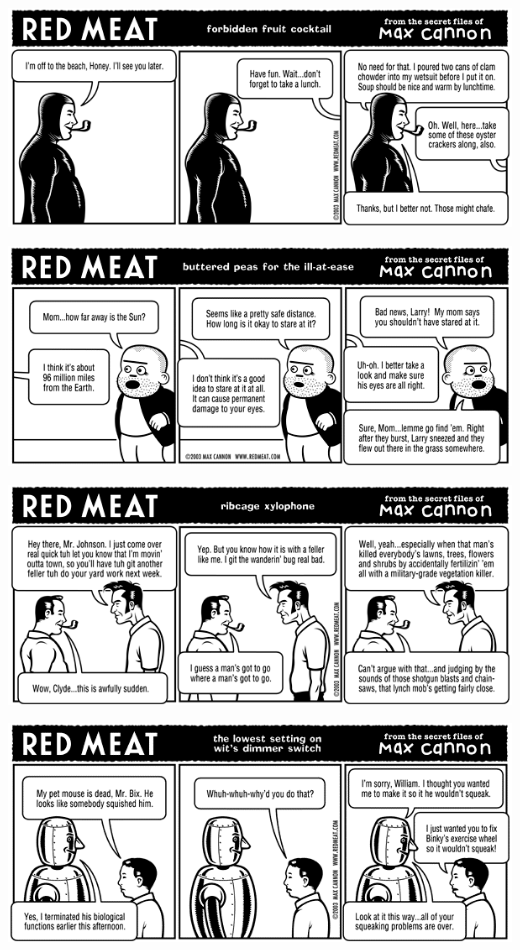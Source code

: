 \documentclass[a4paper,twoside,11pt]{article}
\begin{document}
\includegraphics[width=\textwidth]{redmeat_2003-09-02.png}



\includegraphics[width=\textwidth]{redmeat_2003-09-09.png}



\includegraphics[width=\textwidth]{redmeat_2003-09-16.png}



\includegraphics[width=\textwidth]{redmeat_2003-09-23.png}
\end{document}
